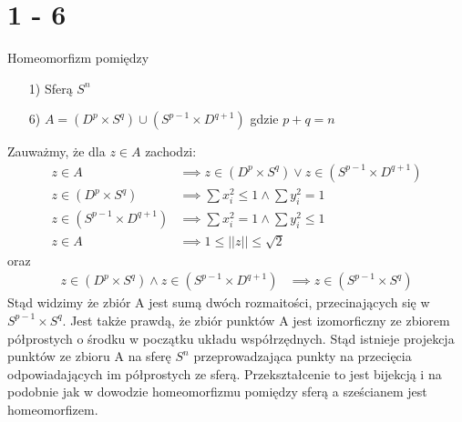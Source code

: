 \newpage
\section*{1 - 6}
Homeomorfizm pomiędzy
\begin{itemize}
  \item[1)] Sferą $S^n$
  \item[6)] $A = (D^p \times S^q) \cup (S^{p-1} \times D^{q+1})$ gdzie $p+q = n$
\end{itemize}
Zauważmy, że dla $z \in A$ zachodzi:
\begin{align*}
  z \in A & \implies z \in (D^p \times S^q) \lor z \in (S^{p-1} \times D^{q+1}) \\
  z \in (D^p \times S^q) & \implies \sum x_i^2 \leq 1 \land \sum y_i^2 = 1 \\
  z \in (S^{p-1} \times D^{q+1}) & \implies \sum x_i^2 = 1 \land \sum y_i^2 \leq 1 \\
  z \in A & \implies 1 \leq ||z|| \leq \sqrt{2}
\end{align*}
oraz
\begin{align*}
  z \in (D^p \times S^q) \land z \in (S^{p-1} \times D^{q+1})  & \implies z \in (S^{p-1} \times S^q)
\end{align*}
Stąd widzimy że zbiór A jest sumą dwóch rozmaitości, przecinających się w $S^{p-1} \times S^q$. Jest także prawdą, że zbiór punktów A jest izomorficzny ze zbiorem półprostych o środku w początku układu współrzędnych. Stąd istnieje projekcja punktów ze zbioru A na sferę $S^n$ przeprowadzająca punkty na przecięcia odpowiadających im półprostych ze sferą. Przekształcenie to jest bijekcją i na podobnie jak w dowodzie homeomorfizmu pomiędzy sferą a sześcianem \cite{hom-cube-sphere} jest homeomorfizem.
